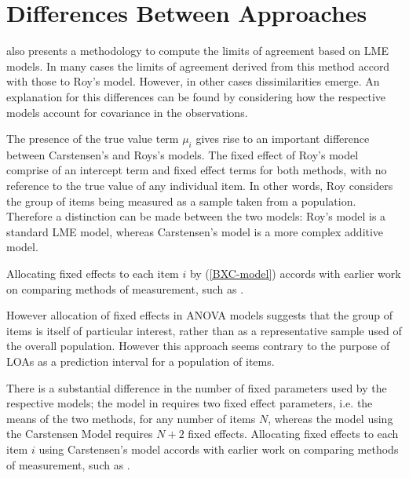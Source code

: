 \documentclass[12pt, a4paper]{report}
\theoremstyle{plain}
\theoremstyle{definition}
\theoremstyle{remark}
\begin{document}
	\section{Differences Between Approaches}
	
	\citet{BXC2008} also presents a methodology to compute the limits of agreement based on LME models. In many cases the limits of agreement derived from this method accord with those to Roy's model. However, in other cases dissimilarities emerge. An explanation for this differences can be found by considering how the respective models account for covariance in the observations.
	
	The presence of the true value term $\mu_i$ gives rise to an important difference between Carstensen's and Roys's models. The fixed effect of Roy's model comprise of an intercept term and fixed effect terms for both methods, with no reference to the true value of any individual item. In other words, Roy considers the group of items being measured as a sample taken from a population. Therefore a distinction can be made between the two models: Roy's model is a standard LME model, whereas Carstensen's model is a more complex additive model.
	
	
	Allocating fixed effects to each item $i$ by (\ref{BXC-model}) accords with earlier work on comparing methods of measurement, such as \citet{Grubbs48}. 

However allocation of fixed effects in ANOVA models suggests that the group of items is itself of particular interest, rather than as a representative sample used of the overall population. However this approach seems contrary to the purpose of LOAs as a prediction interval for a population of items.

There is a substantial difference in the number of fixed parameters used by the respective models; the model in \citet{ARoy2009} requires two fixed effect parameters, i.e. the means of the two methods, for any number of items $N$, whereas the model using the Carstensen Model requires $N+2$ fixed effects. Allocating fixed effects to each item $i$ using Carstensen's model accords with earlier work on comparing methods of measurement, such as \citet{Grubbs48}.
\end{document}
